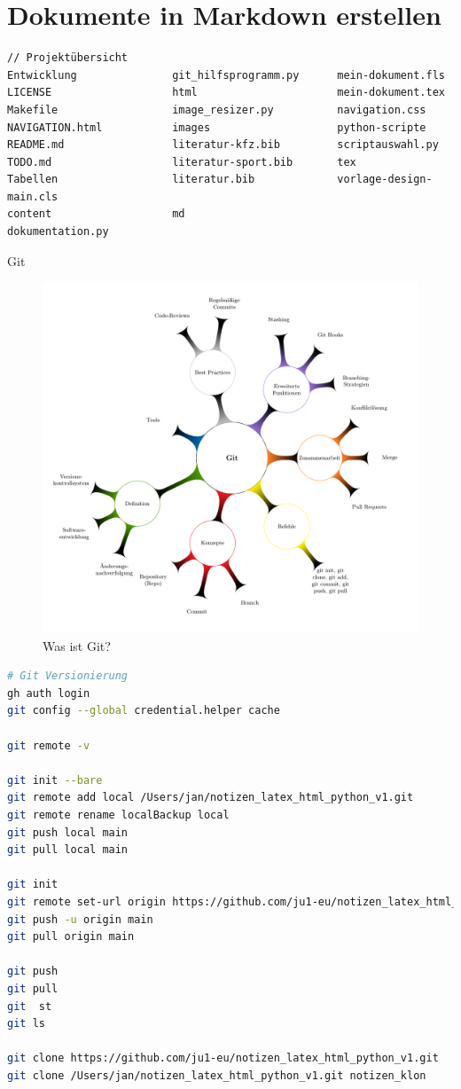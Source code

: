 \documentclass{vorlage-design-main}
\begin{document}
\section{Dokumente in Markdown
erstellen}\label{dokumente-in-markdown-erstellen}

\begin{lstlisting}
// Projektübersicht
Entwicklung               git_hilfsprogramm.py      mein-dokument.fls
LICENSE                   html                      mein-dokument.tex
Makefile                  image_resizer.py          navigation.css
NAVIGATION.html           images                    python-scripte
README.md                 literatur-kfz.bib         scriptauswahl.py
TODO.md                   literatur-sport.bib       tex
Tabellen                  literatur.bib             vorlage-design-main.cls
content                   md
dokumentation.py
\end{lstlisting}

Git

\begin{figure}
\centering
\includegraphics[keepaspectratio]{images/Mindmap-Git.pdf}
\caption{Was ist Git?}
\end{figure}

\begin{lstlisting}[language=bash]
# Git Versionierung
gh auth login
git config --global credential.helper cache

git remote -v

git init --bare
git remote add local /Users/jan/notizen_latex_html_python_v1.git
git remote rename localBackup local
git push local main
git pull local main

git init
git remote set-url origin https://github.com/ju1-eu/notizen_latex_html_python_v1.git
git push -u origin main
git pull origin main

git push
git pull
git  st
git ls

git clone https://github.com/ju1-eu/notizen_latex_html_python_v1.git
git clone /Users/jan/notizen_latex_html_python_v1.git notizen_klon
\end{lstlisting}
\end{document}

